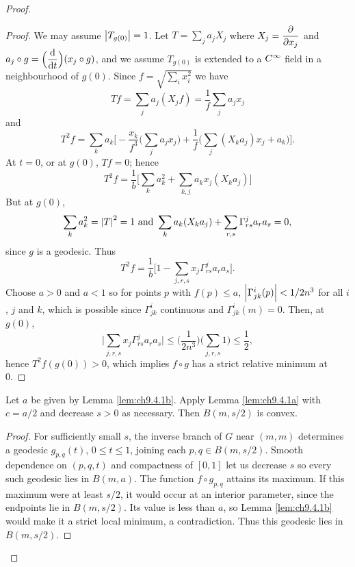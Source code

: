 \documentclass[../main]{subfiles}
\begin{document}
\begin{proof}
\begin{proof}
We may assume $\left|T_{g(0)}\right|=1$. Let $T=\displaystyle\sum_j a_j X_j$ where $X_j = \dfrac{\partial }{\partial x_j}$ and \newline $a_j\circ g = \Big(\dv{}{t}\Big)(x_j\circ g)$, and we assume $T_{g(0)}$ is extended to a $C^\infty$ field in a neighbourhood of $g(0)$. Since $f = \sqrt{\displaystyle\sum_i x_i^2}$ we have 
\[Tf=\sum_j a_j (X_j f) = \dfrac{1}{f} \sum_j a_j x_j\] and 
\[T^2 f = \sum_k a_k\bigg[-\dfrac{x_k}{f^3}\bigg(\sum_j a_jx_j\bigg) + \dfrac{1}{f}\bigg(\sum_j (X_ka_j)x_j+a_k\bigg)\bigg].\] At $t=0$, or at $g(0)$, $Tf = 0$; hence
\[T^2 f = \dfrac{1}{b} \bigg[\sum_k a_k^2 + \sum_{k, j} a_kx_j (X_k a_j)\bigg]\] But at $g(0)$,
\[\sum_k a_k^2 = \left|T\right|^2 = 1\text{ and }\sum_k a_k(X_k a_j) + \sum_{r,s} \Gamma^j_{rs} a_r a_s = 0,\] since $g$ is a geodesic. Thus 
\[T^2 f = \dfrac{1}{b}\bigg[1-\sum_{j,r,s} x_j\Gamma^j_{rs} a_r a_s\bigg].\] Choose $a>0$ and $a<1$ so for points $p$ with $f(p)\le a$, $\left|\Gamma^i_{jk} (p)\right|<1/2n^3$ for all $i$, $j$ and $k$, which is possible since $\Gamma^i_{jk}$ continuous and $\Gamma^i_{jk}(m) = 0$. Then, at $g(0)$,
\[
\bigg|\sum_{j,r,s} x_j \Gamma^j_{rs} a_r a_s\bigg| \le \Big(\frac{1}{2n^3}\Big) \bigg(\sum_{j,r,s} 1\bigg) \le \frac{1}{2},
\]
hence $T^2 f(g(0)) > 0$, which implies $f\circ g$ has a strict relative minimum at 0. 
\end{proof}


\begin{lemma} \label{lem:ch9.4.1c}
Let $a$ be given by Lemma \ref{lem:ch9.4.1b}. Apply Lemma \ref{lem:ch9.4.1a} with $c=a/2$ and decrease $s>0$ as necessary. Then $B(m,s/2)$ is convex.
\end{lemma}

\begin{proof}
For sufficiently small $s$, the inverse branch of $G$ near $(m,m)$ determines a geodesic $g_{p,q}(t)$, $0\leq t\leq1$, joining each $p,q\in B(m,s/2)$. Smooth dependence on $(p,q,t)$ and compactness of $[0,1]$ let us decrease $s$ so every such geodesic lies in $B(m,a)$. The function $f\circ g_{p,q}$ attains its maximum. If this maximum were at least $s/2$, it would occur at an interior parameter, since the endpoints lie in $B(m,s/2)$. Its value is less than $a$, so Lemma \ref{lem:ch9.4.1b} would make it a strict local minimum, a contradiction. Thus this geodesic lies in $B(m,s/2)$.


\end{proof}
\end{proof}
\end{document}
